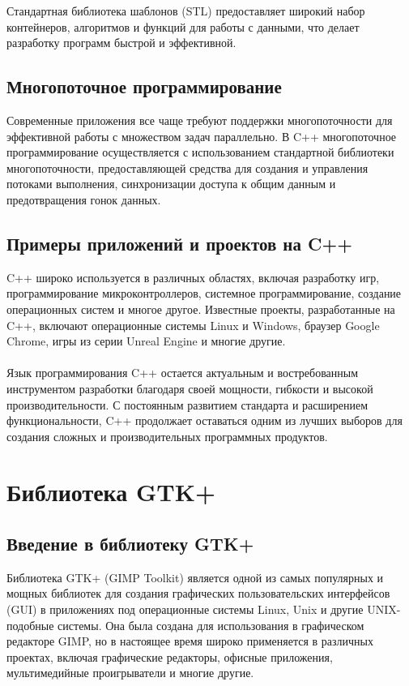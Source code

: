 Стандартная библиотека шаблонов (STL) предоставляет широкий набор контейнеров, алгоритмов и функций для работы с данными, что делает разработку программ быстрой и эффективной.

\subsection{\label{subsec:ch01/sec01/sub04}Многопоточное программирование}
Современные приложения все чаще требуют поддержки многопоточности для эффективной работы с множеством задач параллельно. В C++ многопоточное программирование осуществляется с использованием стандартной библиотеки многопоточности, предоставляющей средства для создания и управления потоками выполнения, синхронизации доступа к общим данным и предотвращения гонок данных.
\subsection{\label{subsec:ch01/sec01/sub05}Примеры приложений и проектов на C++}
C++ широко используется в различных областях, включая разработку игр, программирование микроконтроллеров, системное программирование, создание операционных систем и многое другое. Известные проекты, разработанные на C++, включают операционные системы Linux и Windows, браузер Google Chrome, игры из серии Unreal Engine и многие другие.
\\
\\
Язык программирования C++ остается актуальным и востребованным инструментом разработки благодаря своей мощности, гибкости и высокой производительности. С постоянным развитием стандарта и расширением функциональности, C++ продолжает оставаться одним из лучших выборов для создания сложных и производительных программных продуктов.


\section{\label{sec:ch01/sec02}Библиотека GTK+}

\subsection{\label{subsec:ch01/sec02/sub01}Введение в библиотеку GTK+}
Библиотека GTK+ (GIMP Toolkit) является одной из самых популярных и мощных библиотек для создания графических пользовательских интерфейсов (GUI) в приложениях под операционные системы Linux, Unix и другие UNIX-подобные системы. Она была создана для использования в графическом редакторе GIMP, но в настоящее время широко применяется в различных проектах, включая графические редакторы, офисные приложения, мультимедийные проигрыватели и многие другие.

